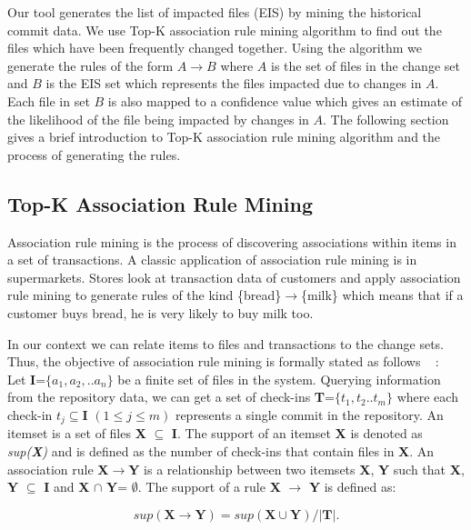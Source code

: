 Our tool generates the list of impacted files (EIS) by mining the historical commit data. We use Top-K association rule mining algorithm to find out the files which have been frequently changed together. Using the algorithm we generate the rules of the form $A \rightarrow B$ where $A$ is the set of files in the change set and $B$ is the EIS set which represents the files impacted due to changes in $A$. Each file in set $B$ is also mapped to a confidence value which gives an estimate of the likelihood of the file being impacted by changes in $A$. The following section gives a brief introduction to Top-K association rule mining algorithm and the process of generating the rules. 

\subsection{Top-K Association Rule Mining}

Association rule mining is the process of discovering associations within items in a set of transactions. A classic application of association rule mining is in supermarkets. Stores look at transaction data of customers and apply association rule mining to generate rules of the kind \{bread\}$\rightarrow$\{milk\} which means that if a customer buys bread, he is very likely to buy milk too.

In our context we can relate items to files and transactions to the change sets. Thus, the objective of association rule mining is formally stated as follows ~\cite{fournier2012mining} :\\
Let \textbf{I}=$\{a_{1},a_{2},..a_{n}\}$ be a finite set of files in the system. Querying information from the repository data, we can get a set of check-ins \textbf{T}=$\{t_{1},t_{2}..t_{m}\}$ where each check-in $t_{j}\subseteq\textbf{I}$ $(1 \le j \le m)$ represents a single commit in the repository. An itemset is a set of files \textbf{X} $\subseteq$ \textbf{I}. The support of an itemset \textbf{X} is denoted as \textit{sup(\textbf{X})} and is defined as the number of check-ins that contain files in \textbf{X}. An association rule \textbf{X}$\rightarrow$\textbf{Y} is a relationship between two itemsets \textbf{X}, \textbf{Y} such that \textbf{X}, \textbf{Y} $\subseteq$ \textbf{I} and \textbf{X} $\cap$ \textbf{Y}= $\emptyset$. The support of a rule \textbf{X} $\rightarrow$ \textbf{Y} is defined as: 

\begin{equation}
\textit{sup}(\textbf{X} \rightarrow \textbf{Y}) = \textit{sup}(\textbf{X}\cup\textbf{Y}) / |\textbf{T}|.
\end{equation}
 

